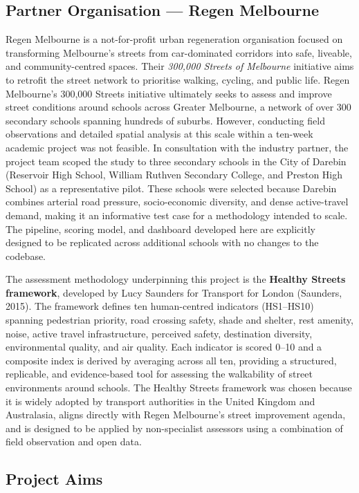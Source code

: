 \documentclass[11pt,a4paper]{article}
\begin{document}
\subsection{Partner Organisation — Regen Melbourne}
Regen Melbourne is a not-for-profit urban regeneration organisation focused on transforming Melbourne's streets from car-dominated corridors into safe, liveable, and community-centred spaces. Their \textit{300,000 Streets of Melbourne} initiative aims to retrofit the street network to prioritise walking, cycling, and public life. Regen Melbourne's 300,000 Streets initiative ultimately seeks to assess and improve street conditions around schools across Greater Melbourne, a network of over 300 secondary schools spanning hundreds of suburbs. However, conducting field observations and detailed spatial analysis at this scale within a ten-week academic project was not feasible. In consultation with the industry partner, the project team scoped the study to three secondary schools in the City of Darebin (Reservoir High School, William Ruthven Secondary College, and Preston High School) as a representative pilot. These schools were selected because Darebin combines arterial road pressure, socio-economic diversity, and dense active-travel demand, making it an informative test case for a methodology intended to scale. The pipeline, scoring model, and dashboard developed here are explicitly designed to be replicated across additional schools with no changes to the codebase.

The assessment methodology underpinning this project is the \textbf{Healthy Streets framework}, developed by Lucy Saunders for Transport for London (Saunders, 2015). The framework defines ten human-centred indicators (HS1--HS10) spanning pedestrian priority, road crossing safety, shade and shelter, rest amenity, noise, active travel infrastructure, perceived safety, destination diversity, environmental quality, and air quality. Each indicator is scored 0--10 and a composite index is derived by averaging across all ten, providing a structured, replicable, and evidence-based tool for assessing the walkability of street environments around schools. The Healthy Streets framework was chosen because it is widely adopted by transport authorities in the United Kingdom and Australasia, aligns directly with Regen Melbourne's street improvement agenda, and is designed to be applied by non-specialist assessors using a combination of field observation and open data.

\subsection{Project Aims}
\end{document}
